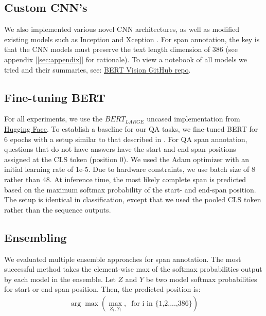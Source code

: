 \subsection{Custom CNN's}

We also implemented various novel CNN architectures, as well as modified existing models such as Inception and Xception \citep{DBLP:journals/corr/SzegedyLJSRAEVR14, DBLP:journals/corr/Chollet16a}. For span annotation, the key is that the CNN models must preserve the text length dimension of 386 (see appendix [\ref{sec:appendix}] for rationale). To view a notebook of all models we tried and their summaries, see: \href{https://github.com/cbenge509/BERTVision}{BERT Vision GitHub repo}.

\subsection{Fine-tuning BERT}

For all experiments, we use the $BERT_{LARGE}$ uncased implementation from \href{https://huggingface.co/}{Hugging Face}. To establish a baseline for our QA tasks, we fine-tuned BERT for 6 epochs with a setup similar to that described in \cite{Devlin2019}. For QA span annotation, questions that do not have answers have the start and end span positions assigned at the CLS token (position 0). We used the Adam optimizer with an initial learning rate of 1e-5. Due to hardware constraints, we use batch size of 8 rather than 48. At inference time, the most likely complete span is predicted based on the maximum softmax probability of the start- and end-span position. The setup is identical in classification, except that we used the pooled CLS token rather than the sequence outputs.

\subsection{Ensembling} 

We evaluated multiple ensemble approaches for span annotation. The most successful method takes the element-wise max of the softmax probabilities output by each model in the ensemble. Let $Z$ and $Y$ be two model softmax probabilities for start or end span position. Then, the predicted position is:
\begin{equation} \label{eq2}
\begin{aligned}
\arg\max\left(\underset{{Z_i, Y_i}}{\max},\;\;\text{for i in \{1,2,...,386\}}\right)
\end{aligned}
\end{equation}

